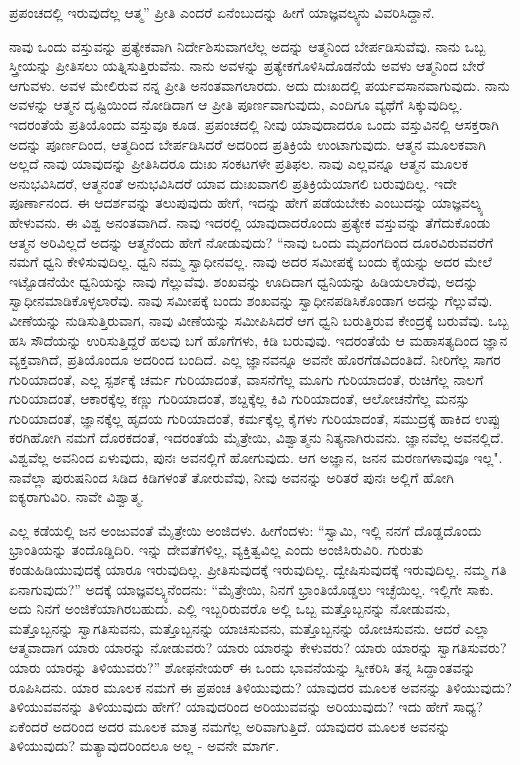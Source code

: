 ಪ್ರಪಂಚದಲ್ಲಿ ಇರುವುದೆಲ್ಲ ಆತ್ಮ” ಪ್ರೀತಿ ಎಂದರೆ ಏನೆಂಬುದನ್ನು ಹೀಗೆ ಯಾಜ್ಞವಲ್ಕ್ಯನು ವಿವರಿಸಿದ್ದಾನೆ.

ನಾವು ಒಂದು ವಸ್ತುವನ್ನು ಪ್ರತ್ಯೇಕವಾಗಿ ನಿರ್ದೇಶಿಸುವಾಗಲೆಲ್ಲ ಅದನ್ನು ಆತ್ಮನಿಂದ ಬೇರ್ಪಡಿಸುವೆವು. ನಾನು ಒಬ್ಬ ಸ್ತ್ರೀಯನ್ನು ಪ್ರೀತಿಸಲು ಯತ್ನಿಸುತ್ತಿರುವೆನು. ನಾನು ಅವಳನ್ನು ಪ್ರತ್ಯೇಕಗೊಳಿಸಿದೊಡನೆಯೆ ಅವಳು ಆತ್ಮನಿಂದ ಬೇರೆ ಆಗುವಳು. ಅವಳ ಮೇಲಿರುವ ನನ್ನ ಪ್ರೀತಿ ಅನಂತವಾಗಲಾರದು. ಅದು ದುಃಖದಲ್ಲಿ ಪರ್ಯವಸಾನವಾಗುವುದು. ನಾನು ಅವಳನ್ನು ಆತ್ಮನ ದೃಷ್ಟಿಯಿಂದ ನೋಡಿದಾಗ ಆ ಪ್ರೀತಿ ಪೂರ್ಣವಾಗುವುದು, ಎಂದಿಗೂ ವ್ಯಥೆಗೆ ಸಿಕ್ಕುವುದಿಲ್ಲ. ಇದರಂತೆಯೆ ಪ್ರತಿಯೊಂದು ವಸ್ತುವೂ ಕೂಡ. ಪ್ರಪಂಚದಲ್ಲಿ ನೀವು ಯಾವುದಾದರೂ ಒಂದು ವಸ್ತುವಿನಲ್ಲಿ ಆಸಕ್ತರಾಗಿ ಅದನ್ನು ಪೂರ್ಣದಿಂದ, ಆತ್ಮದಿಂದ ಬೇರ್ಪಡಿಸಿದರೆ ಅದರಿಂದ ಪ್ರತಿಕ್ರಿಯೆ ಉಂಟಾಗುವುದು. ಆತ್ಮನ ಮೂಲಕವಾಗಿ ಅಲ್ಲದೆ ನಾವು ಯಾವುದನ್ನು ಪ್ರೀತಿಸಿದರೂ ದುಃಖ ಸಂಕಟಗಳೇ ಪ್ರತಿಫಲ. ನಾವು ಎಲ್ಲವನ್ನೂ ಆತ್ಮನ ಮೂಲಕ ಅನುಭವಿಸಿದರೆ, ಆತ್ಮನಂತೆ ಅನುಭವಿಸಿದರೆ ಯಾವ ದುಃಖವಾಗಲಿ ಪ್ರತಿಕ್ರಿಯೆಯಾಗಲಿ ಬರುವುದಿಲ್ಲ. ಇದೇ ಪೂರ್ಣಾನಂದ. ಈ ಆದರ್ಶವನ್ನು ತಲುಪುವುದು ಹೇಗೆ, ಇದನ್ನು ಹೇಗೆ ಪಡೆಯಬೇಕು ಎಂಬುದನ್ನು ಯಾಜ್ಞವಲ್ಕ್ಯ ಹೇಳುವನು. ಈ ವಿಶ್ವ ಅನಂತವಾಗಿದೆ. ನಾವು ಇದರಲ್ಲಿ ಯಾವುದಾದರೊಂದು ಪ್ರತ್ಯೇಕ ವಸ್ತುವನ್ನು ತೆಗೆದುಕೊಂಡು ಆತ್ಮನ ಅರಿವಿಲ್ಲದೆ ಅದನ್ನು ಆತ್ಮನೆಂದು ಹೇಗೆ ನೋಡುವುದು? “ನಾವು ಒಂದು ಮೃದಂಗದಿಂದ ದೂರವಿರುವವರೆಗೆ ನಮಗೆ ಧ್ವನಿ ಕೇಳಿಸುವುದಿಲ್ಲ. ಧ್ವನಿ ನಮ್ಮ ಸ್ವಾಧೀನವಲ್ಲ. ನಾವು ಅದರ ಸಮೀಪಕ್ಕೆ ಬಂದು ಕೈಯನ್ನು ಅದರ ಮೇಲೆ ಇಟ್ಟೊಡನೆಯೇ ಧ್ವನಿಯನ್ನು ನಾವು ಗೆಲ್ಲುವೆವು. ಶಂಖವನ್ನು ಊದಿದಾಗ ಧ್ವನಿಯನ್ನು ಹಿಡಿಯಲಾರೆವು, ಅದನ್ನು ಸ್ವಾಧೀನಮಾಡಿಕೊಳ್ಳಲಾರೆವು. ನಾವು ಸಮೀಪಕ್ಕೆ ಬಂದು ಶಂಖವನ್ನು ಸ್ವಾಧೀನಪಡಿಸಿಕೊಂಡಾಗ ಅದನ್ನು ಗೆಲ್ಲುವೆವು. ವೀಣೆಯನ್ನು ನುಡಿಸುತ್ತಿರುವಾಗ, ನಾವು ವೀಣೆಯನ್ನು ಸಮೀಪಿಸಿದರೆ ಆಗ ಧ್ವನಿ ಬರುತ್ತಿರುವ ಕೇಂದ್ರಕ್ಕೆ ಬರುವೆವು. ಒಬ್ಬ ಹಸಿ ಸೌದೆಯನ್ನು ಉರಿಸುತ್ತಿದ್ದರೆ ಹಲವು ಬಗೆ ಹೊಗೆಗಳು, ಕಿಡಿ ಬರುವುವು. ಇದರಂತೆಯೆ ಆ ಮಹಾಸತ್ಯದಿಂದ ಜ್ಞಾನ ವ್ಯಕ್ತವಾಗಿದೆ, ಪ್ರತಿಯೊಂದೂ ಅದರಿಂದ ಬಂದಿದೆ. ಎಲ್ಲ ಜ್ಞಾನವನ್ನೂ ಅವನೇ ಹೊರಗೆಡವಿದಂತಿದೆ. ನೀರಿಗೆಲ್ಲ ಸಾಗರ ಗುರಿಯಾದಂತೆ, ಎಲ್ಲ ಸ್ಪರ್ಶಕ್ಕೆ ಚರ್ಮ ಗುರಿಯಾದಂತೆ, ವಾಸನೆಗೆಲ್ಲ ಮೂಗು ಗುರಿಯಾದಂತೆ, ರುಚಿಗೆಲ್ಲ ನಾಲಗೆ ಗುರಿಯಾದಂತೆ, ಆಕಾರಕ್ಕೆಲ್ಲ ಕಣ್ಣು ಗುರಿಯಾದಂತೆ, ಶಬ್ದಕ್ಕೆಲ್ಲ ಕಿವಿ ಗುರಿಯಾದಂತೆ, ಆಲೋಚನೆಗೆಲ್ಲ ಮನಸ್ಸು ಗುರಿಯಾದಂತೆ, ಜ್ಞಾನಕ್ಕೆಲ್ಲ ಹೃದಯ ಗುರಿಯಾದಂತೆ, ಕರ್ಮಕ್ಕೆಲ್ಲ ಕೈಗಳು ಗುರಿಯಾದಂತೆ, ಸಮುದ್ರಕ್ಕೆ ಹಾಕಿದ ಉಪ್ಪು ಕರಗಿಹೋಗಿ ನಮಗೆ ದೊರಕದಂತೆ, ಇದರಂತೆಯೆ ಮೈತ್ರೇಯಿ, ವಿಶ್ವಾತ್ಮನು ನಿತ್ಯನಾಗಿರುವನು. ಜ್ಞಾನವೆಲ್ಲ ಅವನಲ್ಲಿದೆ. ವಿಶ್ವವೆಲ್ಲ ಅವನಿಂದ ಏಳುವುದು, ಪುನಃ ಅವನಲ್ಲಿಗೆ ಹೋಗುವುದು. ಆಗ ಅಜ್ಞಾನ, ಜನನ ಮರಣಗಳಾವುವೂ ಇಲ್ಲ". ನಾವೆಲ್ಲಾ ಪುರುಷನಿಂದ ಸಿಡಿದ ಕಿಡಿಗಳಂತೆ ತೋರುವೆವು, ನೀವು ಅವನನ್ನು ಅರಿತರೆ ಪುನಃ ಅಲ್ಲಿಗೆ ಹೋಗಿ ಐಕ್ಯರಾಗುವಿರಿ. ನಾವೇ ವಿಶ್ವಾತ್ಮ.

ಎಲ್ಲ ಕಡೆಯಲ್ಲಿ ಜನ ಅಂಜುವಂತೆ ಮೈತ್ರೇಯಿ ಅಂಜಿದಳು. ಹೀಗೆಂದಳು: “ಸ್ವಾಮಿ, ಇಲ್ಲಿ ನನಗೆ ದೊಡ್ಡದೊಂದು ಭ್ರಾಂತಿಯನ್ನು ತಂದೊಡ್ಡಿದಿರಿ. ಇನ್ನು ದೇವತೆಗಳಿಲ್ಲ, ವ್ಯಕ್ತಿತ್ವವಿಲ್ಲ ಎಂದು ಅಂಜಿಸಿರುವಿರಿ. ಗುರುತು ಕಂಡುಹಿಡಿಯುವುದಕ್ಕೆ ಯಾರೂ ಇರುವುದಿಲ್ಲ. ಪ್ರೀತಿಸುವುದಕ್ಕೆ ಇರುವುದಿಲ್ಲ. ದ್ವೇಷಿಸುವುದಕ್ಕೆ ಇರುವುದಿಲ್ಲ. ನಮ್ಮ ಗತಿ ಏನಾಗುವುದು?'' ಅದಕ್ಕೆ ಯಾಜ್ಞವಲ್ಕ್ಯನೆಂದನು: “ಮೈತ್ರೇಯಿ, ನಿನಗೆ ಭ್ರಾಂತಿಯೊಡ್ಡಲು ಇಚ್ಛೆಯಿಲ್ಲ. ಇಲ್ಲಿಗೇ ಸಾಕು. ಅದು ನಿನಗೆ ಅಂಜಿಕೆಯಾಗಿರಬಹುದು. ಎಲ್ಲಿ ಇಬ್ಬರಿರುವರೊ ಅಲ್ಲಿ ಒಬ್ಬ ಮತ್ತೊಬ್ಬನನ್ನು ನೋಡುವನು, ಮತ್ತೊಬ್ಬನನ್ನು ಸ್ವಾಗತಿಸುವನು, ಮತ್ತೊಬ್ಬನನ್ನು ಯಾಚಿಸುವನು, ಮತ್ತೊಬ್ಬನನ್ನು ಯೋಚಿಸುವನು. ಆದರೆ ಎಲ್ಲಾ ಆತ್ಮವಾದಾಗ ಯಾರು ಯಾರನ್ನು ನೋಡುವರು? ಯಾರು ಯಾರನ್ನು ಕೇಳುವರು? ಯಾರು ಯಾರನ್ನು ಸ್ವಾಗತಿಸುವರು? ಯಾರು ಯಾರನ್ನು ತಿಳಿಯುವರು?” ಶೋಫನೇಯರ್ ಈ ಒಂದು ಭಾವನೆಯನ್ನು ಸ್ವೀಕರಿಸಿ ತನ್ನ ಸಿದ್ದಾಂತವನ್ನು ರೂಪಿಸಿದನು. ಯಾರ ಮೂಲಕ ನಮಗೆ ಈ ಪ್ರಪಂಚ ತಿಳಿಯುವುದು? ಯಾವುದರ ಮೂಲಕ ಅವನನ್ನು ತಿಳಿಯುವುದು? ತಿಳಿಯುವವನನ್ನು ತಿಳಿಯುವುದು ಹೇಗೆ? ಯಾವುದರಿಂದ ಅರಿಯುವವನ್ನು ಅರಿಯುವುದು? ಇದು ಹೇಗೆ ಸಾಧ್ಯ? ಏಕೆಂದರೆ ಅದರಿಂದ ಅದರ ಮೂಲಕ ಮಾತ್ರ ನಮಗೆಲ್ಲ ಅರಿವಾಗುತ್ತಿದೆ. ಯಾವುದರ ಮೂಲಕ ಅವನನ್ನು ತಿಳಿಯುವುದು? ಮತ್ಯಾವುದರಿಂದಲೂ ಅಲ್ಲ - ಅವನೇ ಮಾರ್ಗ.

